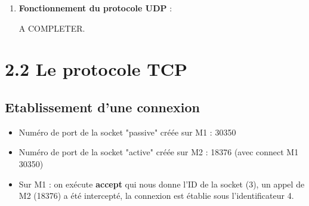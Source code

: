 \documentclass{article}
\begin{document}
\begin{enumerate}[resume]
	\item \textbf{Fonctionnement du protocole UDP} :

A COMPLETER.
\end{enumerate}
	
\section*{2.2 Le protocole TCP}

\subsection*{Etablissement d'une connexion}

\begin{itemize}
	\item Numéro de port de la socket "passive" créée sur M1 : 30350
	\item Numéro de port de la socket "active" créée sur M2 : 18376 (avec connect M1 30350)
	\item Sur M1 : on exécute \textbf{accept} qui nous donne l'ID de la socket (3), un appel de M2 (18376) a été intercepté, la connexion est établie sous l'identificateur 4.
\end{itemize}
\end{document}
